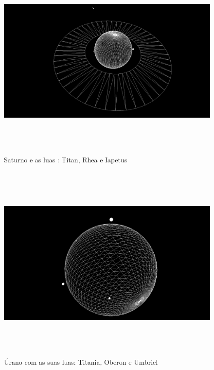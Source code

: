 \documentclass[11pt,a4paper]{report}
\begin{document}
\begin{figure}[H]
\centering
\includegraphics[width = 18cm,height = 10cm]{5.png}
\caption{Saturno e as luas : Titan, Rhea e Iapetus}
\label{fig:demo5}
\end{figure}

\begin{figure}[H]
\centering
\includegraphics[width = 18cm,height = 10cm]{6.png}
\caption{Úrano com as suas luas: Titania, Oberon e Umbriel}
\label{fig:demo6}
\end{figure}
\end{document}
